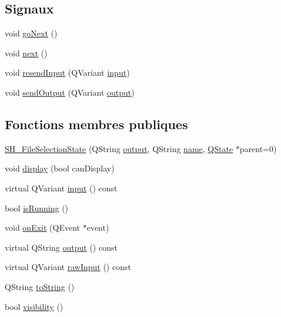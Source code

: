 \subsection*{Signaux}
\begin{DoxyCompactItemize}
\item 
void \hyperlink{classSH__GenericState_a34c1bebc765cc3a62d66c94c37d4f0c3}{go\-Next} ()
\item 
void \hyperlink{classSH__GenericState_ad5e2a1f3dc129336c8f529cf897c2eb0}{next} ()
\item 
void \hyperlink{classSH__InOutState_a1f00480afefd173002cf56d4c4128048}{resend\-Input} (Q\-Variant \hyperlink{classSH__InOutState_a8e1b78069343122df7713624a1a5a100}{input})
\item 
void \hyperlink{classSH__InOutState_a77921c5f42059bc97361f4ff7827da12}{send\-Output} (Q\-Variant \hyperlink{classSH__InOutState_a17ed7eaf5e3ed5af80a4f9fe65d5bfd9}{output})
\end{DoxyCompactItemize}
\subsection*{Fonctions membres publiques}
\begin{DoxyCompactItemize}
\item 
\hyperlink{classSH__FileSelectionState_ad2043e921f26da5ee2dd3032345028a6}{S\-H\-\_\-\-File\-Selection\-State} (Q\-String \hyperlink{classSH__InOutState_a17ed7eaf5e3ed5af80a4f9fe65d5bfd9}{output}, Q\-String \hyperlink{classSH__NamedObject_a9f686c6f2a5bcc08ad03d0cee0151f0f}{name}, \hyperlink{classQState}{Q\-State} $\ast$parent=0)
\item 
void \hyperlink{classSH__InOutState_a616f88b20478b81b2927a9ddc2b4f521}{display} (bool can\-Display)
\item 
virtual Q\-Variant \hyperlink{classSH__InOutState_a8e1b78069343122df7713624a1a5a100}{input} () const 
\item 
bool \hyperlink{classSH__GenericState_a5f731810dad0cacd28828ccbf1539e4e}{is\-Running} ()
\item 
void \hyperlink{classSH__InOutState_afc0433d63375063a43e39adca641e330}{on\-Exit} (Q\-Event $\ast$event)
\item 
virtual Q\-String \hyperlink{classSH__InOutState_a17ed7eaf5e3ed5af80a4f9fe65d5bfd9}{output} () const 
\item 
virtual Q\-Variant \hyperlink{classSH__InOutState_a4c674a54f41d2e6ef951b22393dcd89f}{raw\-Input} () const 
\item 
Q\-String \hyperlink{classSH__GenericState_a7779babbb40f3f8faa71112204d9804f}{to\-String} ()
\item 
bool \hyperlink{classSH__InOutState_a3a18752c4122c26a2ebf38310c9c1b75}{visibility} ()
\end{DoxyCompactItemize}
